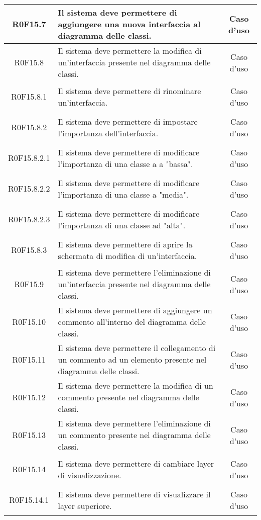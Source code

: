 \documentclass[../AnalisiDeiRequisiti.tex]{subfiles}
\begin{document}
\begin{longtable}{|c|>{\centering}p{7cm}|c|}
\hypertarget{R0F15.7}{R0F15.7} & Il sistema deve permettere di aggiungere una nuova interfaccia al diagramma delle classi. & Caso d'uso \\ \hline
\hypertarget{R0F15.8}{R0F15.8} & Il sistema deve permettere la modifica di un'interfaccia presente nel diagramma delle classi. & Caso d'uso \\ \hline
\hypertarget{R0F15.8.1}{R0F15.8.1} & Il sistema deve permettere di rinominare un'interfaccia. & Caso d'uso \\ \hline
\hypertarget{R0F15.8.2}{R0F15.8.2} & Il sistema deve permettere di impostare l'importanza dell'interfaccia. & Caso d'uso \\ \hline
\hypertarget{R0F15.8.2.1}{R0F15.8.2.1} & Il sistema deve permettere di modificare l'importanza di una classe a a "bassa". & Caso d'uso \\ \hline
\hypertarget{R0F15.8.2.2}{R0F15.8.2.2} & Il sistema deve permettere di modificare l'importanza di una classe a "media". & Caso d'uso \\ \hline
\hypertarget{R0F15.8.2.3}{R0F15.8.2.3} & Il sistema deve permettere di modificare l'importanza di una classe ad "alta". & Caso d'uso \\ \hline
\hypertarget{R0F15.8.3}{R0F15.8.3} & Il sistema deve permettere di aprire la schermata di modifica di un'interfaccia. & Caso d'uso \\ \hline
\hypertarget{R0F15.9}{R0F15.9} & Il sistema deve permettere l'eliminazione di un'interfaccia presente nel diagramma delle classi. & Caso d'uso \\ \hline
\hypertarget{R0F15.10}{R0F15.10} & Il sistema deve permettere di aggiungere un commento all'interno del diagramma delle classi. & Caso d'uso \\ \hline
\hypertarget{R0F15.11}{R0F15.11} & Il sistema deve permettere il collegamento di un commento ad un elemento presente nel diagramma delle classi. & Caso d'uso \\ \hline
\hypertarget{R0F15.12}{R0F15.12} & Il sistema deve permettere la modifica di un commento presente nel diagramma delle classi. & Caso d'uso \\ \hline
\hypertarget{R0F15.13}{R0F15.13} & Il sistema deve permettere l'eliminazione di un commento presente nel diagramma delle classi. & Caso d'uso \\ \hline
\hypertarget{R0F15.14}{R0F15.14} & Il sistema deve permettere di cambiare layer di visualizzazione. & Caso d'uso \\ \hline
\hypertarget{R0F15.14.1}{R0F15.14.1} & Il sistema deve permettere di visualizzare il layer superiore. & Caso d'uso \\ \hline

\end{longtable}
\end{document}
